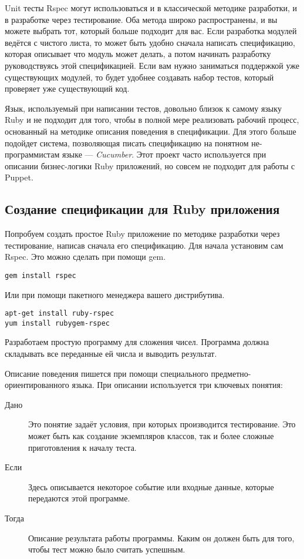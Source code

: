 Unit тесты Rspec могут использоваться и в классической методике разработки, и в разработке через тестирование. Оба метода широко распространены, и вы можете выбрать тот, который больше подходит для вас. Если разработка модулей ведётся с чистого листа, то может быть удобно сначала написать спецификацию, которая описывает что модуль может делать, а потом начинать разработку руководствуясь этой спецификацией. Если вам нужно заниматься поддержкой уже существующих модулей, то будет удобнее создавать набор тестов, который проверяет уже существующий код.

Язык, используемый при написании тестов, довольно близок к самому языку Ruby и не подходит для того, чтобы в полной мере реализовать рабочий процесс, основанный на методике описания поведения в спецификации. Для этого больше подойдет система, позволяющая писать спецификацию на понятном не-программистам языке --- \emph{Cucumber}. Этот проект часто используется при описании бизнес-логики Ruby приложений, но совсем не подходит для работы с Puppet.

\subsection{Создание спецификации для Ruby приложения}

Попробуем создать простое Ruby приложение по методике разработки через тестирование, написав сначала его спецификацию. Для начала установим сам Rspec. Это можно сделать при помощи gem.

\begin{verbatim}
gem install rspec
\end{verbatim}

Или при помощи пакетного менеджера вашего дистрибутива.

\begin{verbatim}
apt-get install ruby-rspec
yum install rubygem-rspec
\end{verbatim}

Разработаем простую программу для сложения чисел. Программа должна складывать все переданные ей числа и выводить результат.

Описание поведения пишется при помощи специального предметно-ориентированного языка. При описании используется три ключевых понятия:

\begin{description}
\item[Дано]
Это понятие задаёт условия, при которых производится тестирование. Это может быть как создание экземпляров классов, так и более сложные приготовления к началу теста.
\item[Если] 
Здесь описывается некоторое событие или входные данные, которые передаются этой программе.
\item[Тогда]
Описание результата работы программы. Каким он должен быть для того, чтобы тест можно было считать успешным.
\end{description}

